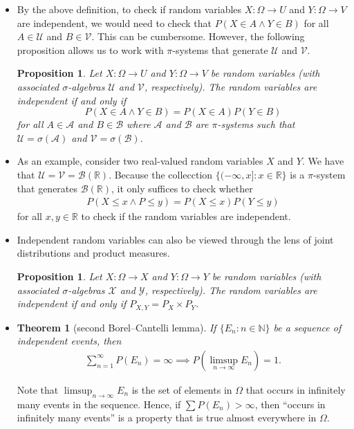 \documentclass[10pt]{article}
\newtheorem{theorem}[lemma]{Theorem}
\newtheorem{proposition}[lemma]{Proposition}
\numberwithin{lemma}{section}
\newcommand{\mcal}[1]{\mathcal{#1}}
\newcommand{\Real}{\mathbb{R}}
\newcommand{\Nat}{\mathbb{N}}
\begin{document}
\begin{itemize}
  \item By the above definition, to check if random variables $X: \Omega \rightarrow U$ and $Y: \Omega \rightarrow V$ are independent, we would need to check that $P(X \in A \wedge Y \in B)$ for all $A \in \mcal{U}$ and $B \in \mcal{V}$. This can be cumbersome. However, the following proposition allows us to work with $\pi$-systems that generate $\mcal{U}$ and $\mcal{V}$.
  
  \begin{proposition}
    Let $X: \Omega \rightarrow U$ and $Y: \Omega \rightarrow V$ be random variables (with associated $\sigma$-algebras $\mcal{U}$ and $\mcal{V}$, respectively). The random variables are independent if and only if $$P(X \in A \wedge Y \in B) = P(X \in A)P(Y \in B)$$ for all $A \in \mcal{A}$ and $B \in \mcal{B}$ where $\mcal{A}$ and $\mcal{B}$ are $\pi$-systems such that $\mcal{U} = \sigma(\mcal{A})$ and $\mcal{V} = \sigma(\mcal{B})$.
  \end{proposition}

  \item As an example, consider two real-valued random variables $X$ and $Y$. We have that $\mcal{U} = \mcal{V} = \mcal{B}(\Real)$. Because the collecction $\{ (-\infty, x] : x \in \Real\}$ is a $\pi$-system that generates $\mcal{B}(\Real)$, it only suffices to check whether
  \begin{align*}
    P(X \leq x \wedge P \leq y) = P(X \leq x)P(Y \leq y)
  \end{align*}
  for all $x,y \in \Real$ to check if the random variables are independent.

  \item Independent random variables can also be viewed through the lens of joint distributions and product measures.
  \begin{proposition}
    Let $X: \Omega \rightarrow X$ and $Y: \Omega \rightarrow Y$ be random variables (with associated $\sigma$-algebras $\mcal{X}$ and $\mcal{Y}$, respectively).
    The random variables are independent if and only if $P_{X,Y} = P_X \times P_Y$.
  \end{proposition}

  \item \begin{theorem}[second Borel--Cantelli lemma]
    If $\{ E_n : n \in \Nat \}$ be a sequence of independent events, then
    \begin{align*}
      \sum_{n=1}^\infty P(E_n) = \infty \implies P(\limsup_{n \rightarrow \infty} E_n) = 1.
    \end{align*}
  \end{theorem}
  Note that $\limsup_{n \rightarrow \infty} E_n$ is the set of elements in $\Omega$ that occurs in infinitely many events in the sequence. Hence, if $\sum P(E_n) > \infty$, then ``occurs in infinitely many events'' is a property that is true almost everywhere in $\Omega$.


\end{itemize}
\end{document}
